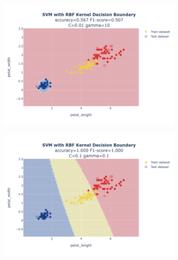 \documentclass{article}
\begin{document}
\begin{figure}
\begin{subfigure}{0.3\textwidth}
        \includegraphics[scale=.13]{images/implementation/q1/rbf_kernel/petal_length_petal_width_0.01_10.png}
    \end{subfigure}
    \newline
    \begin{subfigure}{0.3\textwidth}
        \centering
        \includegraphics[scale=.13]{images/implementation/q1/rbf_kernel/petal_length_petal_width_0.1_0.1.png}
    \end{subfigure}
    \hfill
    \begin{subfigure}{0.3\textwidth}
        \centering

\end{subfigure}
\end{figure}
\end{document}
